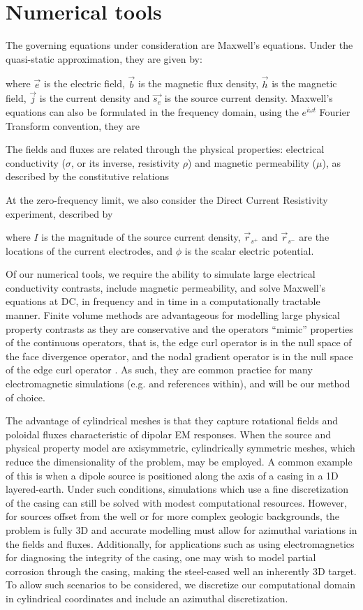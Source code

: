\section{Numerical tools}
\label{sec:numerical_tools}

The governing equations under consideration are Maxwell's equations. Under the quasi-static approximation, they are given by:

where $\vec{e}$ is the electric field, $\vec{b}$ is the magnetic flux density, $\vec{h}$ is the magnetic field, $\vec{j}$ is the current density and $\vec{s_e}$ is the source current density. Maxwell's equations can also be formulated in the frequency domain, using the $e^{i \omega t}$ Fourier Transform convention, they are

The fields and fluxes are related through the physical properties: electrical conductivity ($\sigma$, or its inverse, resistivity $\rho$) and magnetic permeability ($\mu$), as described by the constitutive relations

At the zero-frequency limit, we also consider the Direct Current Resistivity experiment, described by

where $I$ is the magnitude of the source current density, $\vec{r}_{s^+}$ and $\vec{r}_{s^-}$ are the locations of the current electrodes, and $\phi$ is the scalar electric potential.

Of our numerical tools, we require the ability to simulate large electrical conductivity contrasts, include magnetic permeability, and solve Maxwell’s equations at DC, in frequency and in time in a computationally tractable manner. Finite volume methods are advantageous for modelling large physical property contrasts as they are conservative and the operators ``mimic'' properties of the continuous operators, that is, the edge curl operator is in the null space of the face divergence operator, and the nodal gradient operator is in the null space of the edge curl operator \citep{Hyman1999}. As such, they are common practice for many electromagnetic simulations (e.g. \cite{Horesh2011, Haber2014, Jahandari2014} and references within), and will be our method of choice.

The advantage of cylindrical meshes is that they capture rotational fields and poloidal fluxes characteristic of dipolar EM responses. When the source and physical property model are axisymmetric, cylindrically symmetric meshes, which reduce the dimensionality of the problem, may be employed. A common example of this is when a dipole source is positioned along the axis of a casing in a 1D layered-earth. Under such conditions, simulations which use a fine discretization of the casing can still be solved with modest computational resources. However, for sources offset from the well or for more complex geologic backgrounds,  the problem is fully 3D and accurate modelling must allow for azimuthal variations in the fields and fluxes. Additionally, for applications such as using electromagnetics for diagnosing the integrity of the casing, one may wish to model partial corrosion through the casing, making the steel-cased well an inherently 3D target. To allow such scenarios to be considered, we discretize our computational domain in cylindrical coordinates and include an azimuthal discretization.

